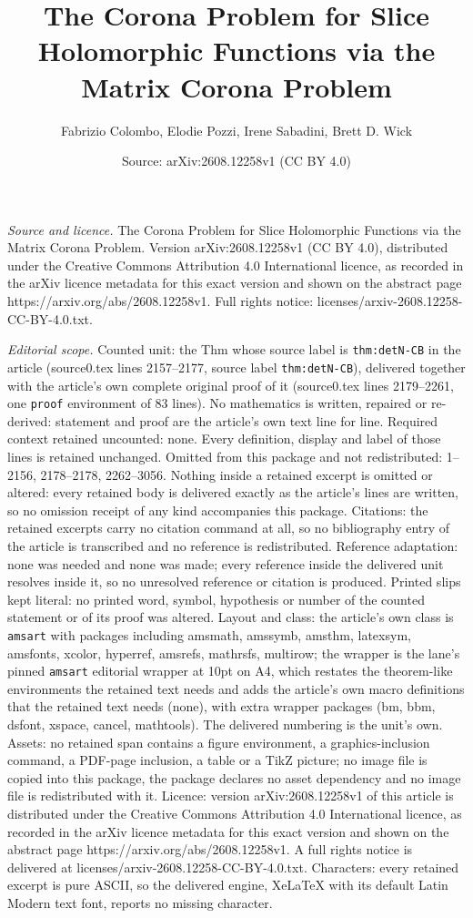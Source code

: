 \documentclass[10pt,a4paper]{amsart}
\title[The Corona Problem for Slice Holomorphic Functions via the M]{The Corona Problem for Slice Holomorphic Functions via the Matrix Corona Problem}
\author{Fabrizio Colombo, Elodie Pozzi, Irene Sabadini, Brett D. Wick}
\date{Source: arXiv:2608.12258v1 (CC BY 4.0)}
\begin{document}
\maketitle

\noindent\emph{Source and licence.} The Corona Problem for Slice Holomorphic Functions via the Matrix Corona Problem. Version arXiv:2608.12258v1 (CC BY 4.0), distributed under the Creative Commons Attribution 4.0 International licence, as recorded in the arXiv licence metadata for this exact version and shown on the abstract page https://arxiv.org/abs/2608.12258v1. Full rights notice: licenses/arxiv-2608.12258-CC-BY-4.0.txt.\par\smallskip

\noindent\textit{Editorial scope.} Counted unit: the Thm whose source label is \texttt{thm:detN-CB} in the article (source0.tex lines 2157--2177, source label \texttt{thm:detN-CB}), delivered together with the article's own complete original proof of it (source0.tex lines 2179--2261, one \texttt{proof} environment of 83 lines). No mathematics is written, repaired or re-derived: statement and proof are the article's own text line for line. Required context retained uncounted: none. Every definition, display and label of those lines is retained unchanged. Omitted from this package and not redistributed: 1--2156, 2178--2178, 2262--3056. Nothing inside a retained excerpt is omitted or altered: every retained body is delivered exactly as the article's lines are written, so no omission receipt of any kind accompanies this package. Citations: the retained excerpts carry no citation command at all, so no bibliography entry of the article is transcribed and no reference is redistributed. Reference adaptation: none was needed and none was made; every reference inside the delivered unit resolves inside it, so no unresolved reference or citation is produced. Printed slips kept literal: no printed word, symbol, hypothesis or number of the counted statement or of its proof was altered. Layout and class: the article's own class is \texttt{amsart} with packages including amsmath, amssymb, amsthm, latexsym, amsfonts, xcolor, hyperref, amsrefs, mathrsfs, multirow; the wrapper is the lane's pinned \texttt{amsart} editorial wrapper at 10pt on A4, which restates the theorem-like environments the retained text needs and adds the article's own macro definitions that the retained text needs (none), with extra wrapper packages (bm, bbm, dsfont, xspace, cancel, mathtools). The delivered numbering is the unit's own. Assets: no retained span contains a figure environment, a graphics-inclusion command, a PDF-page inclusion, a table or a TikZ picture; no image file is copied into this package, the package declares no asset dependency and no image file is redistributed with it. Licence: version arXiv:2608.12258v1 of this article is distributed under the Creative Commons Attribution 4.0 International licence, as recorded in the arXiv licence metadata for this exact version and shown on the abstract page https://arxiv.org/abs/2608.12258v1. A full rights notice is delivered at licenses/arxiv-2608.12258-CC-BY-4.0.txt. Characters: every retained excerpt is pure ASCII, so the delivered engine, XeLaTeX with its default Latin Modern text font, reports no missing character.
\end{document}
